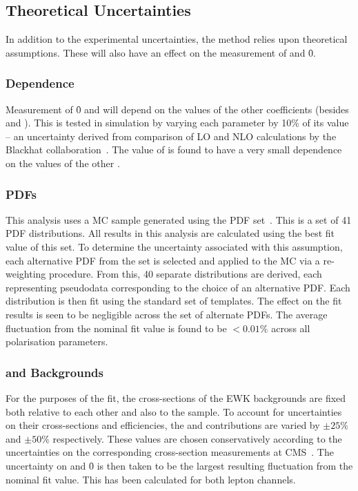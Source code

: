 \subsection{Theoretical Uncertainties}
In addition to the experimental uncertainties, the method relies upon
theoretical assumptions. These will also have an effect on the measurement of
\fLmfR and \f0.

\subsubsection{\Ai Dependence}
Measurement of \f0 and \fLmfR will depend on the values of the other \Ai
coefficients (besides \Azero and \Afour). This is tested in simulation by
varying each parameter \Ai by 10\% of its value -- an uncertainty derived from
comparison of \ac{LO} and \ac{NLO} calculations by the Blackhat
collaboration~\cite{berger_nlo_qcd_wjet}. The value of \fLmfR is found to have a
very small dependence on the values of the other \Ai.

\subsubsection{\aclp{PDF}}
\label{sec:wpol_syst_pdf}
This analysis uses a \Wjets \ac{MC} sample generated using the \cteqsixlone
\ac{PDF} set~\cite{cteq6l1}. This is a set of 41 \ac{PDF} distributions. All
results in this analysis are calculated using the best fit value of this set. To
determine the uncertainty associated with this assumption, each alternative
\ac{PDF} from the set is selected and applied to the \ac{MC} via a re-weighting
procedure. From this, 40 separate \LP distributions are derived, each
representing pseudodata corresponding to the choice of an alternative
\ac{PDF}. Each distribution is then fit using the standard set of templates. The
effect on the fit results is seen to be negligible across the set of alternate
\acp{PDF}. The average fluctuation from the nominal fit value is found to be $<
0.01\%$ across all polarisation parameters.

\subsubsection{\Zjets and \ttbar Backgrounds}
For the purposes of the fit, the cross-sections of the \ac{EWK} backgrounds are
fixed both relative to each other and also to the \Wjets sample. To account for
uncertainties on their cross-sections and efficiencies, the \Zjets and \ttbar
contributions are varied by $\pm 25\%$ and $\pm 50\%$ respectively. These
values are chosen conservatively according to the uncertainties on the
corresponding cross-section measurements at
\ac{CMS}~\cite{cms_wz_pas,cms_ttbar_paper}. The uncertainty on \fLmfR and \f0 is
then taken to be the largest resulting fluctuation from the nominal fit
value. This has been calculated for both lepton channels.

